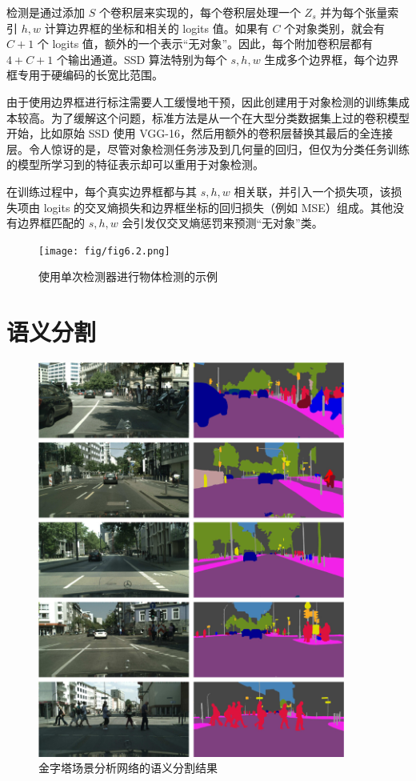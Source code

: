 检测是通过添加 $S$ 个卷积层来实现的，每个卷积层处理一个 $Z_s$ 并为每个张量索引 $h,w$ 计算边界框的坐标和相关的 logits 值。如果有 $C$ 个对象类别，就会有 $C + 1$ 个 logits 值，额外的一个表示``无对象''。因此，每个附加卷积层都有 $4 + C + 1$ 个输出通道。SSD 算法特别为每个 $s,h,w$ 生成多个边界框，每个边界框专用于硬编码的长宽比范围。

由于使用边界框进行标注需要人工缓慢地干预，因此创建用于对象检测的训练集成本较高。为了缓解这个问题，标准方法是从一个在大型分类数据集上过的卷积模型开始，比如原始 SSD 使用 VGG-16，然后用额外的卷积层替换其最后的全连接层。令人惊讶的是，尽管对象检测任务涉及到几何量的回归，但仅为分类任务训练的模型所学习到的特征表示却可以重用于对象检测。

在训练过程中，每个真实边界框都与其 $s,h,w$ 相关联，并引入一个损失项，该损失项由 logits 的交叉熵损失和边界框坐标的回归损失（例如 MSE）组成。其他没有边界框匹配的 $s,h,w$ 会引发仅交叉熵惩罚来预测``无对象''类。

\begin{figure}
    \centering
    \texttt{[image: fig/fig6.2.png]}
    \caption[使用 SSD 进行物体检测]{使用单次检测器进行物体检测的示例 \citep{arxiv-1512.02325}}
    \label{fig6.2}
\end{figure}

\section{语义分割}\label{sec6.4}

\begin{figure}
    \centering
    \includegraphics[width=0.9\textwidth]{fig/fig6.3.png}
    \caption[用 PSP 进行语义分割]{金字塔场景分析网络的语义分割结果 \citep{arxiv-1612.01105}}
    \label{fig6.3}
\end{figure}

